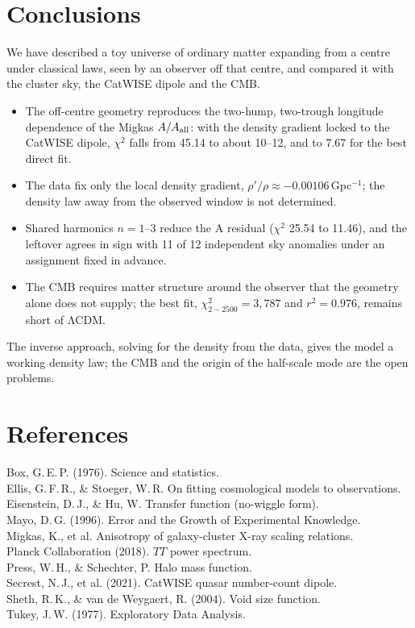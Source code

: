 \documentclass[10pt,twocolumn]{article}
\begin{document}
\section{Conclusions}\label{sec:concl}
We have described a toy universe of ordinary matter expanding from a centre under classical laws, seen by an observer off that centre, and compared it with the cluster sky, the CatWISE dipole and the CMB.
\begin{itemize}\setlength\itemsep{0pt}
\item The off-centre geometry reproduces the two-hump, two-trough longitude dependence of the Migkas $A/A_{\rm all}$: with the density gradient locked to the CatWISE dipole, $\chi^2$ falls from 45.14 to about 10--12, and to 7.67 for the best direct fit.
\item The data fix only the local density gradient, $\rho'/\rho\approx-0.00106$\,Gpc$^{-1}$; the density law away from the observed window is not determined.
\item Shared harmonics $n=1$--3 reduce the A residual ($\chi^2$ 25.54 to 11.46), and the leftover agrees in sign with 11 of 12 independent sky anomalies under an assignment fixed in advance.
\item The CMB requires matter structure around the observer that the geometry alone does not supply; the best fit, $\chi^2_{2-2500}=3{,}787$ and $r^2=0.976$, remains short of ΛCDM.
\end{itemize}
The inverse approach, solving for the density from the data, gives the model a working density law; the CMB and the origin of the half-scale mode are the open problems.

\section*{References}
\small
\noindent Box, G.\,E.\,P. (1976). Science and statistics.\\
Ellis, G.\,F.\,R., \& Stoeger, W.\,R. On fitting cosmological models to observations.\\
Eisenstein, D.\,J., \& Hu, W. Transfer function (no-wiggle form).\\
Mayo, D.\,G. (1996). Error and the Growth of Experimental Knowledge.\\
Migkas, K., et al. Anisotropy of galaxy-cluster X-ray scaling relations.\\
Planck Collaboration (2018). $TT$ power spectrum.\\
Press, W.\,H., \& Schechter, P. Halo mass function.\\
Secrest, N.\,J., et al. (2021). CatWISE quasar number-count dipole.\\
Sheth, R.\,K., \& van de Weygaert, R. (2004). Void size function.\\
Tukey, J.\,W. (1977). Exploratory Data Analysis.
\end{document}
